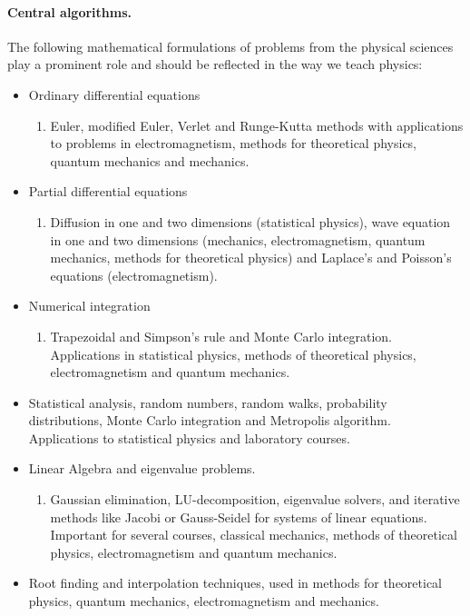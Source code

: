 \documentclass[%
oneside,                 %
final,                   %
10pt]{article}
\begin{document}
\paragraph{Central algorithms.}
The following mathematical formulations of problems from the physical sciences play a prominent role and should be reflected in the way we teach physics:
\begin{itemize}
 \item Ordinary differential equations
\begin{enumerate}

  \item Euler, modified Euler, Verlet and Runge-Kutta methods with applications to problems in electromagnetism, methods for theoretical physics, quantum mechanics and mechanics.

\end{enumerate}

\noindent
 \item Partial differential equations
\begin{enumerate}

  \item Diffusion in one and two dimensions (statistical physics), wave equation in one and two dimensions (mechanics, electromagnetism, quantum mechanics, methods for theoretical physics) and Laplace's and Poisson's equations (electromagnetism).

\end{enumerate}

\noindent
 \item Numerical integration 
\begin{enumerate}

  \item Trapezoidal and Simpson's rule and Monte Carlo integration. Applications in statistical physics, methods of theoretical physics, electromagnetism and quantum mechanics.

\end{enumerate}

\noindent
 \item Statistical analysis, random numbers, random walks, probability distributions, Monte Carlo integration and Metropolis algorithm. Applications to statistical physics and laboratory courses.

 \item Linear Algebra and eigenvalue problems. 
\begin{enumerate}

  \item Gaussian elimination, LU-decomposition, eigenvalue solvers, and iterative methods like  Jacobi or Gauss-Seidel for systems of linear equations. Important for several courses, classical mechanics, methods of theoretical physics, electromagnetism and quantum mechanics.

\end{enumerate}

\noindent
 \item Root finding and interpolation techniques, used in methods for theoretical physics, quantum mechanics, electromagnetism and mechanics.
\end{itemize}
\end{document}
